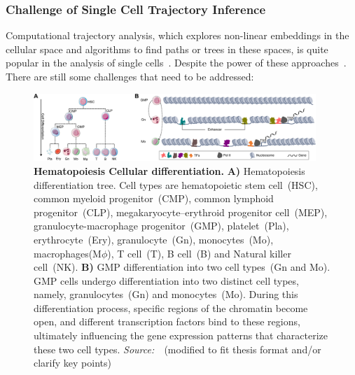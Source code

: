 \subsubsection{Challenge of Single Cell Trajectory Inference}
\label{background:sec2:challenge_TI}
Computational trajectory analysis, which explores non-linear embeddings in the cellular space and algorithms to find paths or trees in these spaces, is quite popular in the analysis of single cells~\citep{wolf2019paga,chen2019stream,street2018slingshot,Lynch2022}. Despite the power of these approaches~\citep{saelens2019comparison}. There are still some challenges that need to be addressed:

\begin{figure}[!h]
	\centering
	\includegraphics[width=0.95\textwidth]{cell_differentiation/fig}
	\vspace{0.1cm}
	\caption[Hematopoiesis Cellular Differentiation]{\textbf{Hematopoiesis Cellular differentiation.} \textbf{A)} Hematopoiesis differentiation tree. Cell types are hematopoietic stem cell~(HSC), common myeloid progenitor~(CMP),  common lymphoid progenitor~(CLP), megakaryocyte–erythroid progenitor cell~(MEP), granulocyte-macrophage progenitor~(GMP), platelet~(Pla), erythrocyte~(Ery), granulocyte~(Gn), monocytes~(Mo), macrophages(M$\phi$), T cell~(T), B cell~(B) and Natural killer cell~(NK). \textbf{B)} GMP differentiation into two cell types~(Gn and Mo). GMP cells undergo differentiation into two distinct cell types, namely, granulocytes~(Gn) and monocytes~(Mo). During this differentiation process, specific regions of the chromatin become open, and different transcription factors bind to these regions, ultimately influencing the gene expression patterns that characterize these two cell types. \emph{Source:~\cite{costa2023dissecting}}~(modified to fit thesis format and/or clarify key points)}
	\label{fig:cell_differentiation}
\end{figure}

